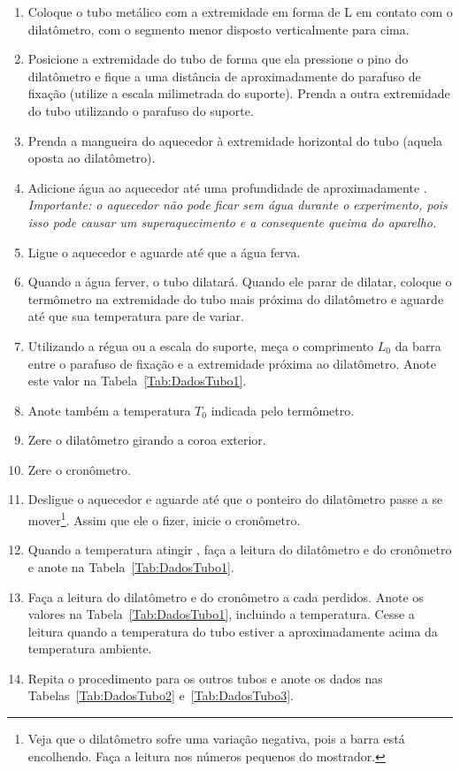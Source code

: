 \begin{enumerate}
\item Coloque o tubo metálico com a extremidade em forma de L em contato com o dilatômetro, com o segmento menor disposto verticalmente para cima.
\item Posicione a extremidade do tubo de forma que ela pressione o pino do dilatômetro e fique a uma distância de aproximadamente  do parafuso de fixação (utilize a escala milimetrada do suporte). Prenda a outra extremidade do tubo utilizando o parafuso do suporte.
\item Prenda a mangueira do aquecedor à extremidade horizontal do tubo (aquela oposta ao dilatômetro).
\item Adicione água ao aquecedor até uma profundidade de aproximadamente . \emph{Importante: o aquecedor não pode ficar sem água durante o experimento, pois isso pode causar um superaquecimento e a consequente queima do aparelho.}
\item Ligue o aquecedor e aguarde  até que a água ferva.
\item Quando a água ferver, o tubo dilatará. Quando ele parar de dilatar, coloque o termômetro na extremidade do tubo mais próxima do dilatômetro e aguarde até que sua temperatura pare de variar.
\item Utilizando a régua ou a escala do suporte, meça o comprimento $L_0$ da barra entre o parafuso de fixação e a extremidade próxima ao dilatômetro. Anote este valor na Tabela~\ref{Tab:DadosTubo1}.
\item Anote também a temperatura $T_0$ indicada pelo termômetro.
\item Zere o dilatômetro girando a coroa exterior.
\item Zere o cronômetro.
\item Desligue o aquecedor e aguarde até que o ponteiro do dilatômetro passe a se mover\footnote{Veja que o dilatômetro sofre uma variação negativa, pois a barra está encolhendo. Faça a leitura nos números pequenos do mostrador.}. Assim que ele o fizer, inicie o cronômetro.
\item Quando a temperatura atingir , faça a leitura do dilatômetro e do cronômetro e anote na Tabela~\ref{Tab:DadosTubo1}.
\item Faça a leitura do dilatômetro e do cronômetro a cada  perdidos. Anote os valores na Tabela~\ref{Tab:DadosTubo1}, incluindo a temperatura. Cesse a leitura quando a temperatura do tubo estiver a aproximadamente  acima da temperatura ambiente.
\item Repita o procedimento para os outros tubos e anote os dados nas Tabelas~\ref{Tab:DadosTubo2} e~\ref{Tab:DadosTubo3}.
\end{enumerate}

